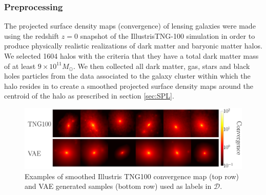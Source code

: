 \subsubsection{Preprocessing}
The projected surface density maps (convergence) of lensing galaxies 
were made using the redshift $z=0$ snapshot  
of the IllustrisTNG-100 simulation \citep{Nelson2018} 
in order to produce physically realistic realizations of dark matter and baryonic matter halos.
We selected 1604 halos with the criteria that they have a total
dark matter mass of at least $9\times10^{11} M_{\odot}$. We then collected all 
dark matter, gas, stars and black holes particles from the data associated to the galaxy 
cluster within which the halo resides in to create a smoothed projected surface density maps 
around the centroid of the halo as prescribed in section \ref{sec:SPL}.

\begin{figure}[t!]
        \centering
        \includegraphics[width=0.7\linewidth]{figures/kap_vae_sample}
        \caption{Examples of smoothed Illustris TNG100 convergence map (top row) 
        and VAE generated samples (bottom row) used as labels in $\mathcal{D}$.}
        \label{fig:kappa}
\end{figure}


